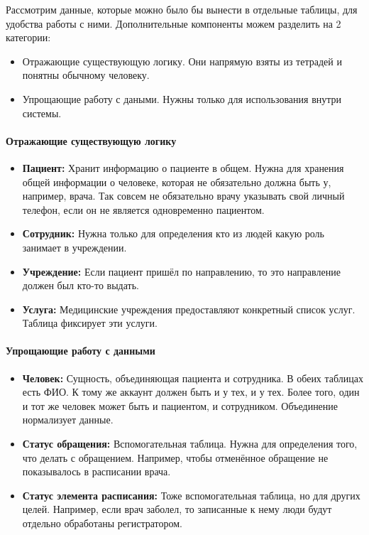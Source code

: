 \documentclass[a4paper,article]{article}
\begin{document}
    Рассмотрим данные, которые можно было бы вынести в отдельные таблицы, для удобства работы с ними. Дополнительные компоненты можем разделить на 2 категории:

    \begin{itemize}[nolistsep]
        \item Отражающие существующую логику. Они напрямую взяты из тетрадей и понятны обычному человеку.
        \item Упрощающие работу с даными. Нужны только для использования внутри системы.
    \end{itemize}

    \paragraph{Отражающие существующую логику}\label{Проектирование БД. Вспомогательные компоненты. Отражающие логику}

    \begin{itemize}[nolistsep]
        \item \textbf{Пациент:} Хранит информацию о пациенте в общем. Нужна для хранения общей информации о человеке, которая не обязательно должна быть у, например, врача. Так совсем не обязательно врачу указывать свой личный телефон, если он не является одновременно пациентом.
        \item \textbf{Сотрудник:} Нужна только для определения кто из людей какую роль занимает в учреждении.
        \item \textbf{Учреждение:} Если пациент пришёл по направлению, то это направление должен был кто-то выдать.
        \item \textbf{Услуга:} Медицинские учреждения предоставляют конкретный список услуг. Таблица фиксирует эти услуги.
    \end{itemize}

    \paragraph{Упрощающие работу с данными}\label{Проектирование БД. Вспомогательные компоненты. Упрощающие работу с данными}

    \begin{itemize}[nolistsep]
        \item \textbf{Человек:} Сущность, объединяющая пациента и сотрудника. В обеих таблицах есть ФИО. К тому же аккаунт должен быть и у тех, и у тех. Более того, один и тот же человек может быть и пациентом, и сотрудником. Объединение нормализует данные.
        \item \textbf{Статус обращения:} Вспомогательная таблица. Нужна для определения того, что делать с обращением. Например, чтобы отменённое обращение не показывалось в расписании врача.
        \item \textbf{Статус элемента расписания:} Тоже вспомогательная таблица, но для других целей. Например, если врач заболел, то записанные к нему люди будут отдельно обработаны регистратором.
    \end{itemize}
\end{document}
